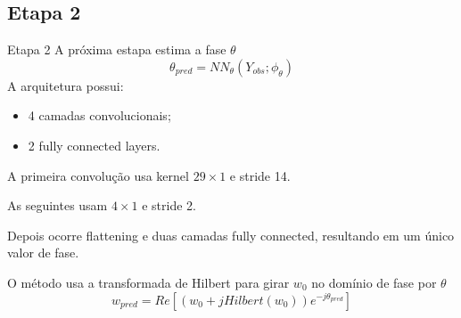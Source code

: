 \subsection{Etapa 2}
\begin{frame}{Etapa 2}
    A próxima estapa estima a fase $\theta$
    \begin{equation}
        \theta_{pred} = NN_{\theta} (Y_{obs};\phi_{\theta})
    \end{equation}
    A arquitetura possui:
    \begin{itemize}
        \item 4 camadas convolucionais;
        \item 2 fully connected layers.
    \end{itemize}
    A primeira convolução usa kernel \(29\times1\) e stride 14.

    As seguintes usam \(4\times1\) e stride 2.

    Depois ocorre flattening e duas camadas fully connected, resultando em um único valor de fase.

    O método usa a transformada de Hilbert para girar $w_0$ no domínio de fase por $\theta$
    \begin{equation}
        w_{pred} = Re[(w_0 + j Hilbert(w_0)) e^{-j\theta_{pred}}]
    \end{equation}
\end{frame}